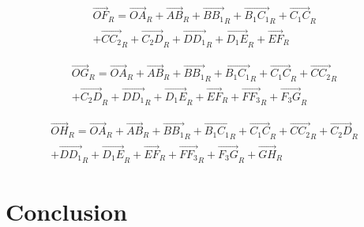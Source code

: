 \documentclass[12pt,a4paper]{article}
\begin{document}
	\begin{equation}
		\begin{split}
			\vec{OF}_R=\vec{OA}_R+\vec{AB}_R+\vec{B B_1}_R+\vec{B_1 C_1}_R+\vec{C_1 C}_R\\+\vec{C C_2}_R+\vec{C_2 D}_R+\vec{D D_1}_R+\vec{D_1 E}_R+\vec{E F}_R
		\end{split}
	\end{equation}
	
	\begin{equation}
		\begin{split}
			\vec{OG}_R=\vec{OA}_R+\vec{AB}_R+\vec{B B_1}_R+\vec{B_1 C_1}_R+\vec{C_1 C}_R+\vec{C C_2}_R\\+\vec{C_2 D}_R+\vec{D D_1}_R+\vec{D_1 E}_R+\vec{E F}_R+\vec{F F_3}_R+\vec{F_3 G}_R
		\end{split}
	\end{equation}
	
	\begin{equation}
		\begin{split}
			\vec{OH}_R=\vec{OA}_R+\vec{AB}_R+\vec{B B_1}_R+\vec{B_1 C_1}_R+\vec{C_1 C}_R+\vec{C C_2}_R+\vec{C_2 D}_R\\+\vec{D D_1}_R+\vec{D_1 E}_R+\vec{E F}_R+\vec{F F_3}_R+\vec{F_3 G}_R+\vec{G H}_R
		\end{split}
	\end{equation}
	
	
	\section{Conclusion}
	
	
\end{document}
